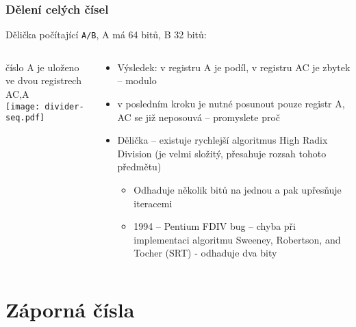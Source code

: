 \documentclass{beamer}
\begin{document}
\begin{frame}
\frametitle{Dělení celých čísel}

Dělička počítající \texttt{A/B}, A má 64 bitů, B 32 bitů:\\
\begin{columns}
\begin{column}{0.4\textwidth}
číslo A je uloženo ve dvou registrech AC,A\\
\texttt{[image: divider-seq.pdf]}
\end{column}
\hfill
\begin{column}{0.6\textwidth}
\begin{itemize}
\item Výsledek: v registru A je podíl, v registru AC je zbytek -- modulo
\item v posledním kroku je nutné posunout pouze registr A, AC se již neposouvá -- promyslete proč
\item Dělička -- existuje rychlejší algoritmus High Radix Division (je velmi složitý, přesahuje rozsah tohoto předmětu)
\begin{itemize}
\item Odhaduje několik bitů na jednou a pak upřesňuje iteracemi
\item 1994 -- Pentium FDIV bug -- chyba při implementaci algoritmu Sweeney, Robertson, and Tocher (SRT) - odhaduje dva bity
\end{itemize}
\end{itemize}
\end{column}
\end{columns}


\end{frame}


\section{Záporná čísla}
\end{document}
